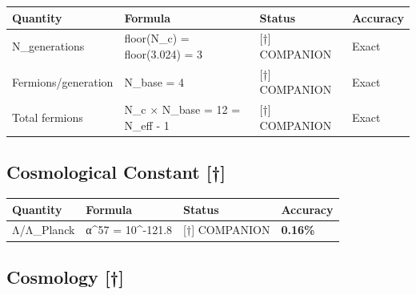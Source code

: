 \documentclass[
  11pt,
  letterpaper,
  twoside,
  openright]{book}
\begin{document}
\begin{longtable}[]{@{}
  >{\raggedright\arraybackslash}p{}
  >{\raggedright\arraybackslash}p{}
  >{\raggedright\arraybackslash}p{}
  >{\raggedright\arraybackslash}p{}@{}}
\toprule\noalign{}
\begin{minipage}[b]{\linewidth}\raggedright
Quantity
\end{minipage} & \begin{minipage}[b]{\linewidth}\raggedright
Formula
\end{minipage} & \begin{minipage}[b]{\linewidth}\raggedright
Status
\end{minipage} & \begin{minipage}[b]{\linewidth}\raggedright
Accuracy
\end{minipage} \\
\midrule\noalign{}
\endhead
\bottomrule\noalign{}
\endlastfoot
N\_generations & floor(N\_c) = floor(3.024) = 3 & {[}†{]} COMPANION &
Exact \\
Fermions/generation & N\_base = 4 & {[}†{]} COMPANION & Exact \\
Total fermions & N\_c × N\_base = 12 = N\_eff - 1 & {[}†{]} COMPANION &
Exact \\
\end{longtable}

\subsection{Cosmological Constant
{[}†{]}}\label{cosmological-constant-1}

\begin{longtable}[]{@{}llll@{}}
\toprule\noalign{}
Quantity & Formula & Status & Accuracy \\
\midrule\noalign{}
\endhead
\bottomrule\noalign{}
\endlastfoot
Λ/Λ\_Planck & α\^{}57 = 10\^{}-121.8 & {[}†{]} COMPANION &
\textbf{0.16\%} \\
\end{longtable}

\subsection{Cosmology {[}†{]}}\label{cosmology-2}
\end{document}
